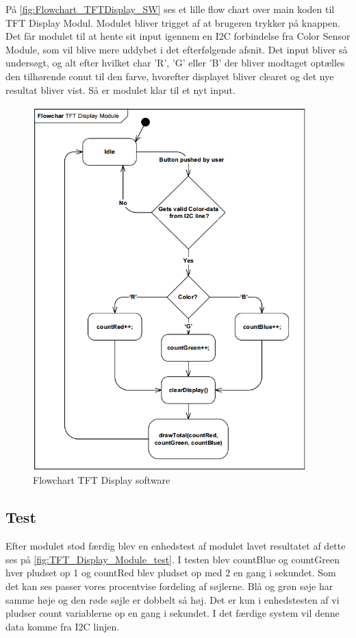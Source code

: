 På \autoref{fig:Flowchart_TFTDisplay_SW} ses et lille flow chart over main koden til TFT Display Modul. Modulet bliver trigget af at brugeren trykker på knappen. Det får modulet til at hente sit input igennem en I2C forbindelse fra Color Sensor Module, som vil blive mere uddybet i det efterfølgende afsnit. Det input bliver så undersøgt, og alt efter hvilket char 'R', 'G' eller 'B' der bliver modtaget optælles den tilhørende conut til den farve, hvorefter displayet bliver clearet og det nye resultat bliver vist. Så er modulet klar til et nyt input.
\begin{figure}[H]
	\centering
	\includegraphics[width = 300pt]{Img/Flowchart_TFTDisplay_SW.png}
	\caption{Flowchart TFT Display software}
	\label{fig:Flowchart_TFTDisplay_SW}
\end{figure}


\subsection{Test}
Efter modulet stod færdig blev en enhedstest af modulet lavet resultatet af dette ses på \autoref{fig:TFT_Display_Module_test}. I testen blev countBlue og countGreen hver pludset op 1 og countRed blev pludset op med 2 en gang i sekundet. Som det kan ses passer vores procentvise fordeling af søjlerne. Blå og grøn søje har samme høje og den røde søjle er dobbelt så høj. Det er kun i enhedstesten af vi pludser count variablerne op en gang i sekundet. I det færdige system vil denne data komme fra I2C linjen. 


